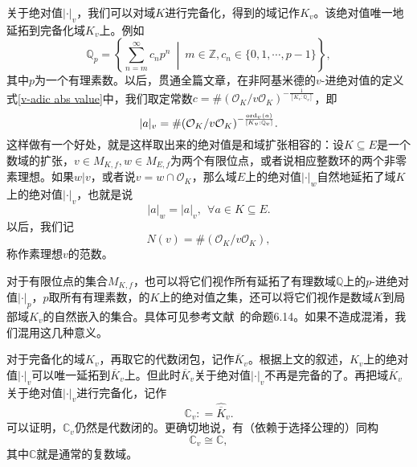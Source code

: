 关于绝对值$|\cdot|_v$，我们可以对域$K$进行完备化，得到的域记作$K_v$。该绝对值唯一地延拓到完备化域$K_v$上。例如
\begin{equation}
\mathbb{Q}_p = \left\{ \sum\limits_{n=m}^{\infty} c_n p^n \ \middle|\ m \in \mathbb{Z}, c_n \in \{ 0, 1, \cdots, p-1 \} \right\},
\end{equation}
其中$p$为一个有理素数。以后，贯通全篇文章，在非阿基米德的$v$-进绝对值的定义式\eqref{v-adic abs value}中，我们取定常数$c = \#(\mathcal{O}_K / v\mathcal{O}_K)^{-\frac{1}{[K_v:\mathbb{Q}_v]}}$，即
\begin{equation} \label{explicit v-adic abs value}
|a|_v = \#(\mathcal{O}_K / v\mathcal{O}_K)^{-\frac{\operatorname{ord}_v(a)}{[K_v:\mathbb{Q}_v]}}.
\end{equation}
这样做有一个好处，就是这样取出来的绝对值是和域扩张相容的：设$K\subseteq E$是一个数域的扩张，$v\in M_{K,f}, w\in M_{E,f}$为两个有限位点，或者说相应整数环的两个非零素理想。如果$w|v$，或者说$v = w \cap \mathcal{O}_K$，那么域$E$上的绝对值$|\cdot|_w$自然地延拓了域$K$上的绝对值$|\cdot|_v$，也就是说
\begin{equation}
|a|_w = |a|_v, ~~ \forall a \in K \subseteq E.
\end{equation}
以后，我们记
\begin{equation} \label{prime ideal norm}
N(v) = \#(\mathcal{O}_K / v\mathcal{O}_K),
\end{equation}
称作素理想$v$的范数。

\begin{remark}
对于有限位点的集合$M_{K,f}$，也可以将它们视作所有延拓了有理数域$\mathbb{Q}$上的$p$-进绝对值$|\cdot|_p$，$p$取所有有理素数，的$K$上的绝对值之集，还可以将它们视作是数域$K$到局部域$K_v$的自然嵌入的集合。具体可见参考文献~的命题6.14。如果不造成混淆，我们混用这几种意义。
\end{remark}

\begin{remark} \label{the field C_v}
对于完备化的域$K_v$，再取它的代数闭包，记作$\overline{K}_v$。根据上文的叙述，$K_v$上的绝对值$|\cdot|_v$可以唯一延拓到$\overline{K}_v$上。但此时$\overline{K}_v$关于绝对值$|\cdot|_v$不再是完备的了。再把域$\overline{K}_v$关于绝对值$|\cdot|_v$进行完备化，记作
\begin{equation}
\mathbb{C}_v : = \widehat{\overline{K}}_v.
\end{equation}
可以证明，$\mathbb{C}_v$仍然是代数闭的。更确切地说，有（依赖于选择公理的）同构
\begin{equation}
\mathbb{C}_v \cong \mathbb{C},
\end{equation}
其中$\mathbb{C}$就是通常的复数域。
\end{remark}

